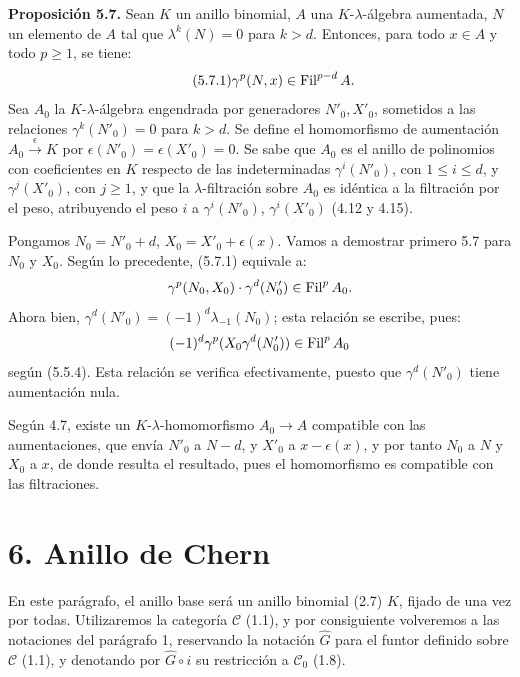 \providecommand{\sisi}[2]{#2}

\textbf{Proposición 5.7.} Sean \(K\) un anillo binomial, \(A\) una \(K\)-\(\lambda\)-álgebra aumentada, \(N\) un elemento de \(A\) tal que \(\lambda^k(N)=0\) para \(k>d\). Entonces, para todo \(x\in A\) y todo \(p\ge1\), se tiene:
\begin{equation}\tag{5.7.1}
  \gamma^p(N,x)\in\operatorname{Fil}^{p-d}A.
\end{equation}
Sea \(A_0\) la \(K\)-\(\lambda\)-álgebra engendrada por generadores \(N'_0,X'_0\), sometidos a las relaciones \(\gamma^k(N'_0)=0\) para \(k>d\). Se define el homomorfismo de aumentación \(A_0\xrightarrow{\epsilon}K\) por \(\epsilon(N'_0)=\epsilon(X'_0)=0\). Se sabe que \(A_0\) es el anillo de polinomios con coeficientes en \(K\) respecto de las indeterminadas \(\gamma^i(N'_0)\), con \(1\le i\le d\), y \(\gamma^j(X'_0)\), con \(j\ge1\), y que la \(\lambda\)-filtración sobre \(A_0\) es idéntica a la filtración por el peso, atribuyendo el peso \(i\) a \(\gamma^i(N'_0)\), \(\gamma^i(X'_0)\) (4.12 y 4.15).

Pongamos \(N_0=N'_0+d\), \(X_0=X'_0+\epsilon(x)\). Vamos a demostrar primero 5.7 para \(N_0\) y \(X_0\). Según lo precedente, (5.7.1) equivale a:
\[
  \gamma^p(N_0,X_0)\cdot\gamma^d(N'_0)\in\operatorname{Fil}^pA_0.
\]
Ahora bien, \(\gamma^d(N'_0)=(-1)^d\lambda_{-1}(N_0)\); esta relación se escribe, pues:
\[
  (-1)^d\gamma^p(X_0\gamma^d(N'_0))\in\operatorname{Fil}^pA_0
\]
según (5.5.4). Esta relación se verifica efectivamente, puesto que \(\gamma^d(N'_0)\) tiene aumentación nula.

Según 4.7, existe un \(K\)-\(\lambda\)-homomorfismo \(A_0\longrightarrow A\) compatible con las aumentaciones, que envía \(N'_0\) a \(N-d\), y \(X'_0\) a \(x-\epsilon(x)\), y por tanto \(N_0\) a \(N\) y \(X_0\) a \(x\), de donde resulta el resultado, pues el homomorfismo es compatible con las filtraciones.

\section*{6. Anillo de Chern}

En este parágrafo, el anillo base será un anillo binomial (2.7) \(K\), fijado de una vez por todas. Utilizaremos la categoría \(\mathcal C\) (1.1), y por consiguiente volveremos a las notaciones del parágrafo 1, reservando la notación \(\widehat G\) para el funtor definido sobre \(\mathcal C\) (1.1), y denotando por \(\widehat G\circ i\) su restricción a \(\mathcal C_0\) (1.8).

